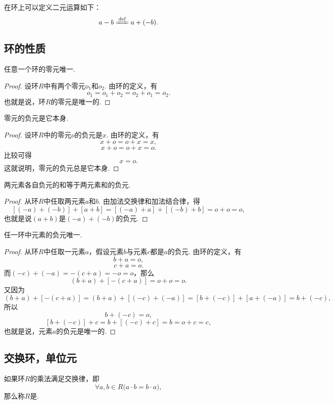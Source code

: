 在环上可以定义二元运算如下：\[
    a - b \defeq a + (-b).
\]

\subsection{环的性质}
\begin{property}
任意一个环的零元唯一.
\begin{proof}
设环\(R\)中有两个零元\(o_1\)和\(o_2\).
由环的定义，有\[
    o_1 = o_1 + o_2 = o_2 + o_1 = o_2.
\]
也就是说，环\(R\)的零元是唯一的.
\end{proof}
\end{property}

\begin{property}
零元的负元是它本身.
\begin{proof}
设环\(R\)中的零元\(o\)的负元是\(x\).
由环的定义，有\[
    x + o = o + x = x,
\]\[
    x + o = o + x = o.
\]比较可得\[
    x = o.
\]
这就说明，零元的负元总是它本身.
\end{proof}
\end{property}

\begin{property}
两元素各自负元的和等于两元素和的负元.
\begin{proof}
从环\(R\)中任取两元素\(a\)和\(b\).
由加法交换律和加法结合律，得\[
    [(-a) + (-b)] + [a + b]
    = [(-a) + a] + [(-b) + b]
    = o + o = o,
\]
也就是说\((a+b)\)是\((-a) + (-b)\)的负元.
\end{proof}
\end{property}

\begin{property}
任一环中元素的负元唯一.
\begin{proof}
从环\(R\)中任取一元素\(a\)，假设元素\(b\)与元素\(c\)都是\(a\)的负元.
由环的定义，有\[
    b + a = o,
\]\[
    c + a = o.
\]
而\((-c) + (-a) = -(c + a) = -o = o\)，那么\[
    (b + a) + [-(c + a)]
    = o + o = o.
\]又因为\[
    (b + a) + [-(c + a)]
    = (b + a) + [(-c) + (-a)]
    = [b + (-c)] + [a + (-a)]
    = b + (-c),
\]所以\[
    b + (-c) = o,
\]\[
    [b + (-c)] + c = b + [(-c) + c] = b = o + c = c,
\]
也就是说，元素\(a\)的负元是唯一的.
\end{proof}
\end{property}

\subsection{交换环，单位元}
\begin{definition}
如果环\(R\)的乘法满足交换律，即\[
    \forall a,b \in R \bigl( a \cdot b = b \cdot a \bigr),
\]
那么称\(R\)是.
\end{definition}

